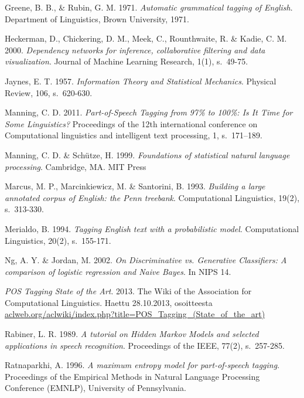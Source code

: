 \documentclass[utf8,bachelor,manualbib]{gradu3}
\begin{document}
\begin{thebibliography}{}
Greene, B. B., \& Rubin, G. M. 1971. \textit{Automatic grammatical tagging of English}. Department of Linguistics, Brown University, 1971.

Heckerman, D., Chickering, D. M., Meek, C., Rounthwaite, R. \& Kadie, C. M. 2000. \textit{Dependency networks for inference, collaborative filtering and data visualization}.
Journal of Machine Learning Research, 1(1), s.~49-75.

Jaynes, E. T. 1957. \textit{Information Theory and Statistical Mechanics}. Physical Review, 106, s.~620-630.

Manning, C. D. 2011. \textit{Part-of-Speech Tagging from 97\% to 100\%: Is It Time for Some Linguistics?} Proceedings of the 12th international conference on Computational linguistics and intelligent text processing, 1, s.~171--189.

Manning, C. D. \& Sch\"{u}tze, H. 1999. \textit{Foundations of statistical natural language processing}.
Cambridge, MA. MIT Press

Marcus, M. P., Marcinkiewicz, M. \& Santorini, B. 1993. \textit{Building a large annotated corpus of English: the Penn treebank}. Computational Linguistics, 19(2), s.~313-330.

Merialdo, B. 1994. \textit{Tagging English text with a probabilistic model}. Computational Linguistics, 20(2), s.~155-171.

Ng, A. Y. \& Jordan, M. 2002. \textit{On Discriminative vs. Generative Classifiers: A comparison of logistic regression and Naive Bayes}. In NIPS 14.

\textit{POS Tagging State of the Art}. 2013. The Wiki of the Association for Computational Linguistics.
Haettu 28.10.2013, osoitteesta \url{aclweb.org/aclwiki/index.php?title=POS_Tagging_(State_of_the_art)}

Rabiner, L. R. 1989. \textit{A tutorial on Hidden Markov Models and selected applications in speech recognition}. Proceedings of the IEEE, 77(2), s.~257-285.

Ratnaparkhi, A. 1996. \textit{A maximum entropy model for part-of-speech tagging}. Proceedings of the Empirical Methods in Natural Language Processing Conference (EMNLP), University of Pennsylvania.


\end{thebibliography}
\end{document}
